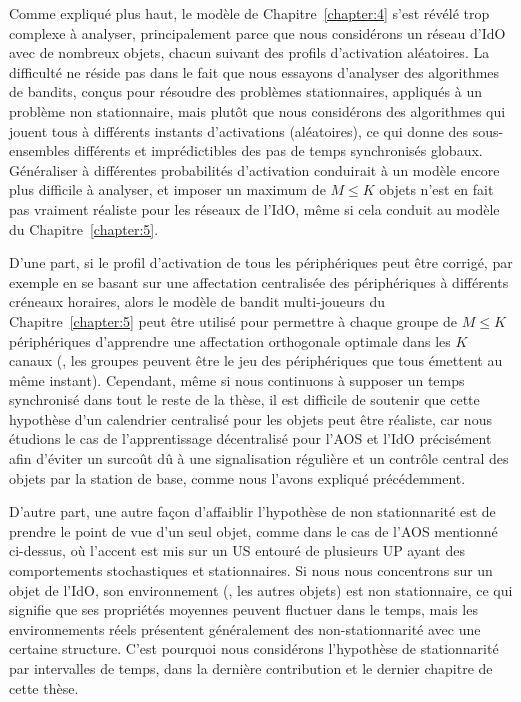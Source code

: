 \begin{resume_fr}
Comme expliqué plus haut, le modèle de Chapitre~\ref{chapter:4} s'est révélé trop complexe à analyser, principalement parce que nous considérons un réseau d'IdO avec de nombreux objets, chacun suivant des profils d'activation aléatoires.
La difficulté ne réside pas dans le fait que nous essayons d'analyser des algorithmes de bandits, conçus pour résoudre des problèmes stationnaires, appliqués à un problème non stationnaire,
mais plutôt que nous considérons des algorithmes qui jouent tous à différents instants d'activations (aléatoires), ce qui donne des sous-ensembles différents et imprédictibles des pas de temps synchronisés globaux.
Généraliser à différentes probabilités d'activation conduirait à un modèle encore plus difficile à analyser, et imposer un maximum de $M \leq K$ objets n'est en fait pas vraiment réaliste pour les réseaux de l'IdO, même si cela conduit au modèle du Chapitre~\ref{chapter:5}.

D'une part, si le profil d'activation de tous les périphériques peut être corrigé, par exemple en se basant sur une affectation centralisée des périphériques à différents créneaux horaires, alors le modèle de bandit multi-joueurs du Chapitre~\ref{chapter:5} peut être utilisé pour permettre à chaque groupe de $M \leq K$ périphériques d'apprendre une affectation orthogonale optimale dans les $K$ canaux (\eg, les groupes peuvent être le jeu des périphériques que tous émettent au même instant).
%
Cependant, même si nous continuons à supposer un temps synchronisé dans tout le reste de la thèse,
il est difficile de soutenir que cette hypothèse d'un calendrier centralisé pour les objets peut être réaliste, car nous étudions le cas de l'apprentissage décentralisé pour l'AOS et l'IdO précisément afin d'éviter un surcoût dû à une signalisation régulière et un contrôle central des objets par la station de base, comme nous l'avons expliqué précédemment.

D'autre part, une autre façon d'affaiblir l'hypothèse de non stationnarité est de prendre le point de vue d'un seul objet, comme dans le cas de l'AOS mentionné ci-dessus, où l'accent est mis sur un US entouré de plusieurs UP ayant des comportements stochastiques et stationnaires.
Si nous nous concentrons sur un objet de l'IdO, son environnement (\ie, les autres objets) est non stationnaire, ce qui signifie que ses propriétés moyennes peuvent fluctuer dans le temps, mais les environnements réels présentent généralement des non-stationnarité avec une certaine structure.
C'est pourquoi nous considérons l'hypothèse de stationnarité par intervalles de temps, dans la dernière contribution et le dernier chapitre de cette thèse.



\end{resume_fr}
